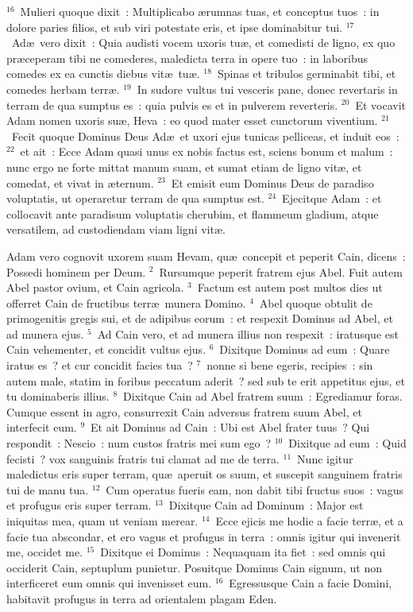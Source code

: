 ${}^{16}$~Mulieri quoque dixit~: Multiplicabo \ae rumnas tuas, et conceptus tuos~: in dolore paries filios, et sub viri potestate eris, et ipse dominabitur tui.
${}^{17}$~Ad\ae\ vero dixit~: Quia audisti vocem uxoris tu\ae , et comedisti de ligno, ex quo pr\ae ceperam tibi ne comederes, maledicta terra in opere tuo~: in laboribus comedes ex ea cunctis diebus vit\ae\ tu\ae .
${}^{18}$~Spinas et tribulos germinabit tibi, et comedes herbam terr\ae .
${}^{19}$~In sudore vultus tui vesceris pane, donec revertaris in terram de qua sumptus es~: quia pulvis es et in pulverem reverteris.
${}^{20}$~Et vocavit Adam nomen uxoris su\ae , Heva~: eo quod mater esset cunctorum viventium.
${}^{21}$~Fecit quoque Dominus Deus Ad\ae\ et uxori ejus tunicas pelliceas, et induit eos~:
${}^{22}$~et ait~: Ecce Adam quasi unus ex nobis factus est, sciens bonum et malum~: nunc ergo ne forte mittat manum suam, et sumat etiam de ligno vit\ae , et comedat, et vivat in \ae ternum.
${}^{23}$~Et emisit eum Dominus Deus de paradiso voluptatis, ut operaretur terram de qua sumptus est.
${}^{24}$~Ejecitque Adam~: et collocavit ante paradisum voluptatis cherubim, et flammeum gladium, atque versatilem, ad custodiendam viam ligni vit\ae .

\lettrine[lines=3,image=true,loversize=0.05,lraise=-0.03]{A}{}dam vero cognovit uxorem suam Hevam, qu\ae\ concepit et peperit Cain, dicens~: Possedi hominem per Deum.
${}^{2}$~Rursumque peperit fratrem ejus Abel. Fuit autem Abel pastor ovium, et Cain agricola.
${}^{3}$~Factum est autem post multos dies ut offerret Cain de fructibus terr\ae\ munera Domino.
${}^{4}$~Abel quoque obtulit de primogenitis gregis sui, et de adipibus eorum~: et respexit Dominus ad Abel, et ad munera ejus.
${}^{5}$~Ad Cain vero, et ad munera illius non respexit~: iratusque est Cain vehementer, et concidit vultus ejus.
${}^{6}$~Dixitque Dominus ad eum~: Quare iratus es~? et cur concidit facies tua~?
${}^{7}$~nonne si bene egeris, recipies~: sin autem male, statim in foribus peccatum aderit~? sed sub te erit appetitus ejus, et tu dominaberis illius.
${}^{8}$~Dixitque Cain ad Abel fratrem suum~: Egrediamur foras. Cumque essent in agro, consurrexit Cain adversus fratrem suum Abel, et interfecit eum.
${}^{9}$~Et ait Dominus ad Cain~: Ubi est Abel frater tuus~? Qui respondit~: Nescio~: num custos fratris mei sum ego~?
${}^{10}$~Dixitque ad eum~: Quid fecisti~? vox sanguinis fratris tui clamat ad me de terra.
${}^{11}$~Nunc igitur maledictus eris super terram, qu\ae\ aperuit os suum, et suscepit sanguinem fratris tui de manu tua.
${}^{12}$~Cum operatus fueris eam, non dabit tibi fructus suos~: vagus et profugus eris super terram.
${}^{13}$~Dixitque Cain ad Dominum~: Major est iniquitas mea, quam ut veniam merear.
${}^{14}$~Ecce ejicis me hodie a facie terr\ae , et a facie tua abscondar, et ero vagus et profugus in terra~: omnis igitur qui invenerit me, occidet me.
${}^{15}$~Dixitque ei Dominus~: Nequaquam ita fiet~: sed omnis qui occiderit Cain, septuplum punietur. Posuitque Dominus Cain signum, ut non interficeret eum omnis qui invenisset eum.
${}^{16}$~Egressusque Cain a facie Domini, habitavit profugus in terra ad orientalem plagam Eden.


